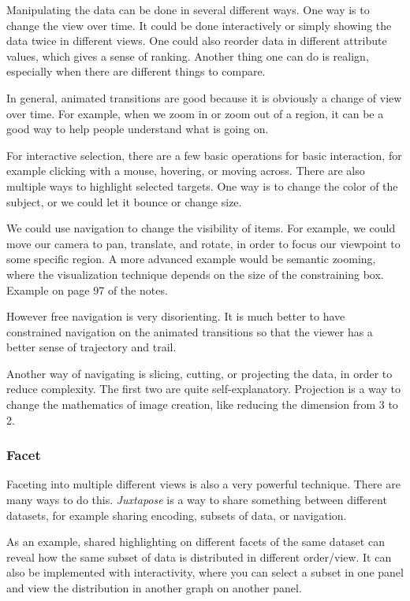 \documentclass[letterpaper, 11pt]{article}
\numberwithin{equation}{section}
\numberwithin{figure}{section}
\begin{document}
Manipulating the data can be done in several different ways. One way is to
change the view over time. It could be done interactively or simply showing the
data twice in different views. One could also reorder data in different
attribute values, which gives a sense of ranking. Another thing one can do is
realign, especially when there are different things to compare.

In general, animated transitions are good because it is obviously a change of
view over time. For example, when we zoom in or zoom out of a region, it can be
a good way to help people understand what is going on.

For interactive selection, there are a few basic operations for basic
interaction, for example clicking with a mouse, hovering, or moving across.
There are also multiple ways to highlight selected targets. One way is to change
the color of the subject, or we could let it bounce or change size.

We could use navigation to change the visibility of items. For example, we could
move our camera to pan, translate, and rotate, in order to focus our viewpoint to some
specific region. A more advanced example would be semantic zooming, where the
visualization technique depends on the size of the constraining box. Example on
page 97 of the notes.

However free navigation is very disorienting. It is much better to have
constrained navigation on the animated transitions so that the viewer has a
better sense of trajectory and trail.

Another way of navigating is slicing, cutting, or projecting the data, in order
to reduce complexity. The first two are quite self-explanatory. Projection is a
way to change the mathematics of image creation, like reducing the dimension
from 3 to 2.

\subsubsection{Facet}

Faceting into multiple different views is also a very powerful technique. There
are many ways to do this. \emph{Juxtapose} is a way to share something between
different datasets, for example sharing encoding, subsets of data, or
navigation.

As an example, shared highlighting on different facets of the same dataset can
reveal how the same subset of data is distributed in different order/view. It
can also be implemented with interactivity, where you can select a subset in one
panel and view the distribution in another graph on another panel.
\end{document}
